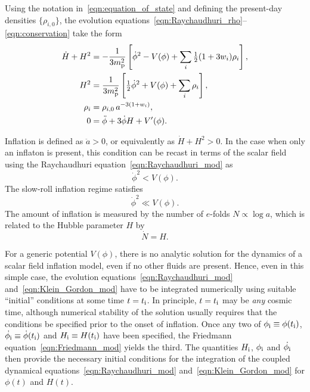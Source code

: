 Using the notation in~\eqref{eqn:equation_of_state} and defining the present-day densities $\{\rho_{i,0}\}$, the evolution equations~\eqref{eqn:Raychaudhuri_rho}--\eqref{eqn:conservation} take the form 
%
\begin{align}
  \dot{H}+H^2 &= 
  -\frac{1}{3m_{\mathrm{p}}^2}\left[\dot{\phi}^2 - V(\phi) +
  \sum_i{\textstyle\frac{1}{2}}(1+3w_i)\rho_i\right] ,
  \label{eqn:Raychaudhuri_mod}
  \\
  H^2 &= 
  \frac{1}{3m_{\mathrm{p}}^2}\left[{\textstyle\frac{1}{2}}\dot{\phi}^2 + V(\phi) +
  \sum_i\rho_i\right],
  \label{eqn:Friedmann_mod} 
  \\
  \rho_i &= 
  \rho_{i,0} \,a^{-3(1+w_i)},
  \label{eqn:rho_a} 
  \\ 
  0&= 
  \ddot{\phi} +3\dot{\phi}H + V^\prime(\phi).
  \label{eqn:Klein_Gordon_mod}
\end{align}
%                                                          

Inflation is defined as $\ddot{a}>0$, or equivalently as $\dot{H}+H^2>0$. In the case when only an inflaton is present, this condition can be recast in terms of the scalar field using the Raychaudhuri equation~\eqref{eqn:Raychaudhuri_mod} as
%
\begin{equation}
  \dot{\phi}^2<V(\phi).
  \label{eqn:Onset_inflation}
\end{equation}
%
The slow-roll inflation regime satisfies
%
\begin{equation}
  \dot{\phi}^2\ll V(\phi).
  \label{eqn:Slow-roll}
\end{equation}
%
The amount of inflation is measured by the number of $e$-folds $N\propto \log a$, which is related to the Hubble parameter $H$ by
%
\begin{equation}
  \dot{N}=H.\label{eqn:e-folds}
\end{equation}
%

For a generic potential $V(\phi)$, there is no analytic solution for the dynamics of a scalar field inflation model, even if no other fluids are present. Hence, even in this simple case, the evolution equations~\eqref{eqn:Raychaudhuri_mod} and~\eqref{eqn:Klein_Gordon_mod} have to be integrated numerically using suitable ``initial'' conditions at some time $t=t_{\mathrm{i}}$. In principle, $t=t_{\mathrm{i}}$ may be {\em any\/} cosmic time, although numerical stability of the solution usually requires that the conditions be specified prior to the onset of inflation.  Once any two of $\phi_{\mathrm{i}} \equiv \phi(t_{\mathrm{i}})$, $\dot{\phi_{\mathrm{i}}} \equiv \dot{\phi}(t_{\mathrm{i}})$ and $H_{\mathrm{i}} \equiv H(t_{\mathrm{i}})$ have been specified, the Friedmann equation~\eqref{eqn:Friedmann_mod} yields the third. The quantities $H_{\mathrm{i}}$, $\phi_{\mathrm{i}}$ and $\dot{\phi_{\mathrm{i}}}$ then provide the necessary initial conditions for the integration of the coupled dynamical equations~\eqref{eqn:Raychaudhuri_mod} and~\eqref{eqn:Klein_Gordon_mod} for $\phi(t)$ and $H(t)$.
